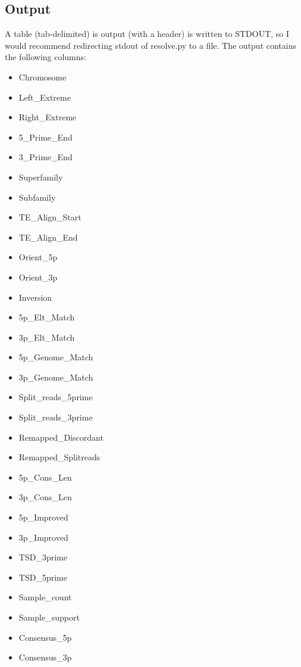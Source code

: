 \documentclass[letterpaper,11pt]{article}
\begin{document}
\subsection{Output}
A table (tab-delimited) is output (with a header) is written to STDOUT, so I would recommend redirecting stdout of resolve.py to a file. The output contains the following columns:

\begin{itemize}
\item Chromosome
\item Left\_Extreme
\item Right\_Extreme
\item 5\_Prime\_End
\item 3\_Prime\_End
\item Superfamily
\item Subfamily
\item TE\_Align\_Start
\item TE\_Align\_End
\item Orient\_5p
\item Orient\_3p
\item Inversion
\item 5p\_Elt\_Match
\item 3p\_Elt\_Match
\item 5p\_Genome\_Match
\item 3p\_Genome\_Match
\item Split\_reads\_5prime
\item Split\_reads\_3prime
\item Remapped\_Discordant
\item Remapped\_Splitreads
\item 5p\_Cons\_Len
\item 3p\_Cons\_Len
\item 5p\_Improved
\item 3p\_Improved
\item TSD\_3prime
\item TSD\_5prime
\item Sample\_count
\item Sample\_support
\item Consensus\_5p
\item Consensus\_3p
\end{itemize}
\end{document}
